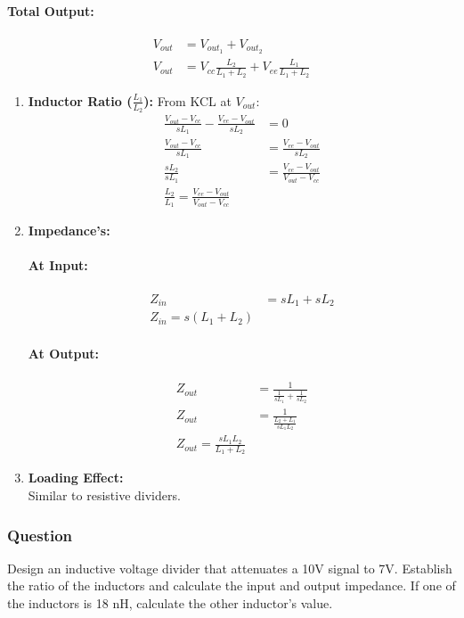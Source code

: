 \paragraph{Total Output:}
\begin{align*}
  V_{out} &= V_{out_1} + V_{out_2} \\
  V_{out} &= V_{cc} \frac{L_2}{L_1 + L_2} + V_{ee} \frac{L_1}{L_1 + L_2}
\end{align*}


\begin{enumerate}
  \item \textbf{Inductor Ratio (\(\frac{L_1}{L_2}\)):}
    From KCL at \(V_{out}\):
    \begin{align*}
      \frac{V_{out} - V_{cc}}{sL_1} - \frac{V_{ee} - V_{out}}{sL_2} &= 0 \\
      \frac{V_{out} - V_{cc}}{sL_1} &= \frac{V_{ee} - V_{out}}{sL_2} \\
      \frac{sL_2}{sL_1} &= \frac{V_{ee} - V_{out}}{V_{out} - V_{cc}} \\
      \frac{L_2}{L_1} = \frac{V_{ee} - V_{out}}{V_{out} - V_{cc}}
    \end{align*}
  \item \textbf{Impedance's:}
    \paragraph{At Input:}
      \begin{align*}
        Z_{in} &= sL_1 + sL_2 \\
        Z_{in} = s(L_1 + L_2)
      \end{align*}
    \paragraph{At Output:}
      \begin{align*}
        Z_{out} &= \frac{1}{\frac{1}{sL_1} + \frac{1}{sL_2}} \\
        Z_{out} &= \frac{1}{\frac{L_2 + L_1}{sL_1 L_2}} \\
        Z_{out} = \frac{sL_1 L_2}{L_1 + L_2}
      \end{align*}
  \item \textbf{Loading Effect:} \\
    Similar to resistive dividers.
\end{enumerate}

\subsubsection{Question}
Design an inductive voltage divider that attenuates a 10V signal to 7V.
Establish the ratio of the inductors and calculate the input and output
impedance. If one of the inductors is 18 nH, calculate the other inductor's
value.
